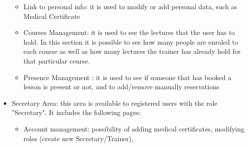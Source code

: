 \begin{itemize}
	\begin{itemize}
		\item Link to personal info: it is used to modify or add personal data, such as Medical Certificate
		\item Courses Management: it is used to see the lectures that the user has to hold. In this section it is possible to see how many people are enroled to each course as well as how many lectures the trainer has already hold for that particular course.
		\item Presence Management : it is used to see if someone that has booked a lesson is present or not, and to add/remove manually reservations
	\end{itemize}
	\item Secretary Area: this area is available to registered users with the role "Secretary".
	It includes the following pages:
	\begin{itemize}
		\item Account management: possibility of adding medical certificates, modifying roles (create new Secretary/Trainer), 
		
	\end{itemize}
\end{itemize}
